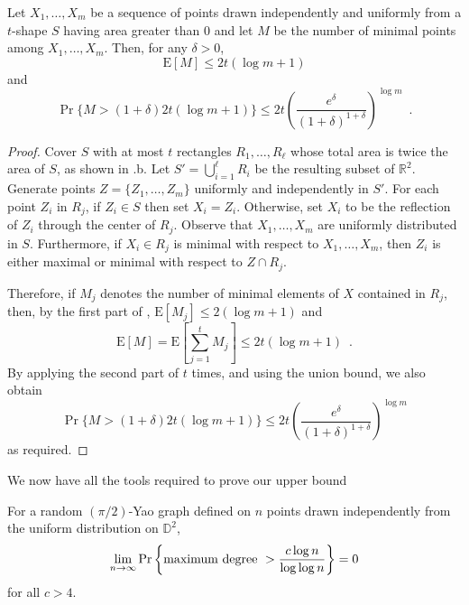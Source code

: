 \documentclass[lotsofwhite,charterfonts]{patmorin}
\newcommand{\RR}{\mathbb{R}}
\newcommand{\D}{\mathbb{D}}
\newcommand{\PROB}{\Pr}
\newcommand{\EXP}{\mathrm{E}}
\begin{document}
\begin{lem}
  Let $X_1,\ldots,X_m$ be a sequence of points drawn independently and
  uniformly from a $t$-shape $S$ having area greater than
  0 and let $M$ be the number of minimal points
  among $X_1,\ldots,X_m$.  Then, for any $\delta >0$,
  \begin{equation}
    \EXP[M] \le 2t(\log m + 1)
  \end{equation}
  and 
  \begin{equation}
    \PROB\{M>(1+\delta)2t(\log m+1)\} 
        \le 2t\left(\frac{e^\delta}{(1+\delta)^{1+\delta}}\right)^{\log m} 
	\enspace .
  \end{equation}
\end{lem}

\begin{proof}
Cover $S$ with at most $t$ rectangles $R_1,\ldots,R_\ell$ whose total area
is twice the area of $S$, as shown in .b.  Let
$S'=\bigcup_{i=1}^\ell R_i$ be the resulting subset of $\RR^2$.  Generate
points $Z=\{Z_1,\ldots,Z_m\}$ uniformly and independently in $S'$.  For each
point $Z_i$ in $R_j$, if $Z_i\in S$ then set $X_i=Z_i$.  Otherwise, set
$X_i$ to be the reflection of $Z_i$ through the center of $R_j$.  Observe
that $X_1,\ldots,X_m$ are uniformly distributed in $S$.  Furthermore, if
$X_i\in R_j$ is minimal with respect to $X_1,\ldots,X_m$, then $Z_i$ is either
maximal or minimal with respect to $Z \cap R_j$.

Therefore, if $M_j$ denotes the number of minimal elements of $X$ contained
in $R_j$, then, by the first part of , $\EXP[M_j]\le
2(\log m+1)$ and 
\[
     \EXP[M] = \EXP\left[\sum_{j=1}^t M_j\right] \le 2t(\log m + 1)
     \enspace .
\]
By applying the second part of  $t$ times,
and using the union bound, we also obtain
\[
    \PROB\{M>(1+\delta)2t(\log m+1)\} 
        \le 2t\left(\frac{e^\delta}{(1+\delta)^{1+\delta}}\right)^{\log m} 
\]
as required.
\end{proof}

We now have all the tools required to prove our upper bound

\begin{thm}
For a random $(\pi/2)$-Yao graph defined on $n$ points drawn
independently from the uniform distribution on
$\D^2$, 
\[
\lim_{n\to\infty} \PROB \left\{ \hbox{\rm maximum degree}~> {c \log n \over
\log \log n} \right\} = 0
\]
for all $c > 4$.
\end{thm}
\end{document}
